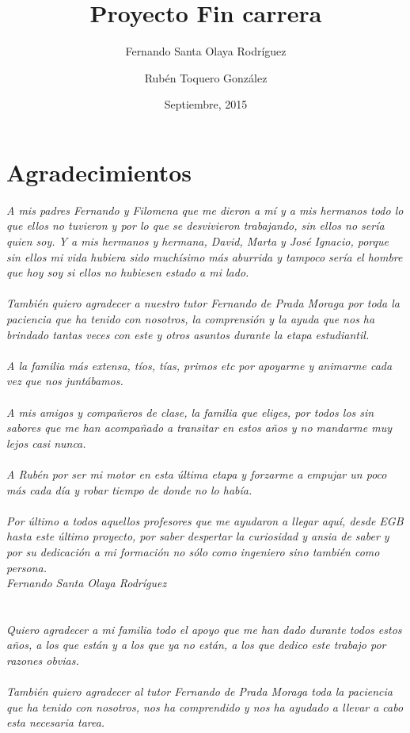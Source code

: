 \documentclass[b5paper,10pt,twoside]{book}
\title{Proyecto Fin carrera}
\author{Fernando Santa Olaya Rodríguez \\
	\and 
	Rubén Toquero González}
\date{Septiembre, 2015}
\begin{document}
\nocite {goossens93,thesiscanc1,latexmanual,conceptdis,backend,codretre,drawmenu,katadojo,proagile}
	

	\chapter*{Agradecimientos}

	
	\textit{A mis padres Fernando y Filomena que me dieron a mí y a mis hermanos todo lo que ellos no tuvieron y por lo que se desvivieron trabajando, sin ellos no sería quien soy. Y a mis hermanos y hermana, David, Marta y José Ignacio, porque sin ellos mi vida hubiera sido muchísimo más aburrida y tampoco sería el hombre que hoy soy si ellos no hubiesen estado a mi lado.\\\\
		También quiero agradecer a nuestro tutor Fernando de Prada Moraga por toda la paciencia que ha tenido con nosotros, la comprensión y la ayuda que nos ha brindado tantas veces con este y otros asuntos durante la etapa estudiantil.\\\\
		A la familia más extensa, tíos, tías, primos etc por apoyarme y animarme cada vez que nos juntábamos.\\\\
		A mis amigos y compañeros de clase, la familia que eliges, por todos los sin sabores que me han acompañado a transitar en estos años y no mandarme muy lejos casi nunca.\\\\
		A Rubén por ser mi motor en esta última etapa y forzarme a empujar un poco más cada día y robar tiempo de donde no lo había.\\\\
		Por último a todos aquellos profesores que me ayudaron a llegar aquí, desde EGB hasta este último proyecto, por saber despertar la curiosidad y ansia de saber y por su dedicación a mi formación no sólo como ingeniero sino también como persona.\\
		Fernando Santa Olaya Rodríguez\\\\\\
		Quiero agradecer a mi familia todo el apoyo que me han dado durante todos estos años, a los que están y a los que ya no están, a los que dedico este trabajo por razones obvias.\\\\
		También quiero agradecer al tutor Fernando de Prada Moraga toda la paciencia que ha tenido con nosotros, nos ha comprendido y nos ha ayudado a llevar a cabo esta necesaria tarea.\\\\
}
\end{document}
